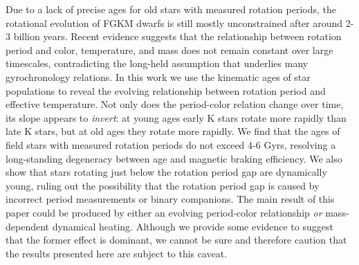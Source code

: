 
Due to a lack of precise ages for old stars with measured rotation periods,
the rotational evolution of FGKM dwarfs is still mostly unconstrained after
around 2-3 billion years.
Recent evidence suggests that the relationship between rotation period and
color, temperature, and mass does not remain constant over large timescales,
contradicting the long-held assumption that underlies many gyrochronology
relations.
In this work we use the kinematic ages of star populations to reveal the
evolving relationship between rotation period and effective temperature.
Not only does the period-color relation change over time, its slope appears to
{\it invert}: at young ages early K stars rotate more rapidly than late K
stars, but at old ages they rotate more rapidly.
We find that the ages of field stars with measured rotation periods do not
exceed 4-6 Gyrs, resolving a long-standing degeneracy between age and magnetic
braking efficiency.
We also show that stars rotating just below the rotation period gap are
dynamically young, ruling out the possibility that the rotation period gap is
caused by incorrect period measurements or binary companions.
The main result of this paper could be produced by either an evolving
period-color relationship {\it or} mass-dependent dynamical heating.
Although we provide some evidence to suggest that the former effect is
dominant, we cannot be sure and therefore caution that the results presented
here are subject to this caveat.
